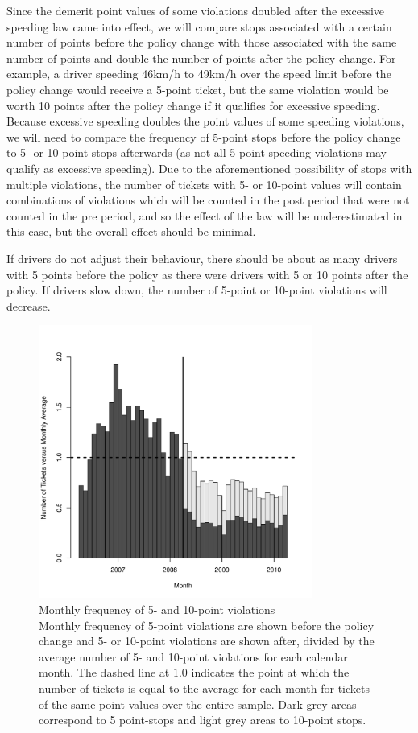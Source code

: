 Since the demerit point values of some violations doubled 
after the excessive speeding law came into effect, 
% 
we will compare stops associated with a certain number of points 
before the policy change with those associated with the 
same number of points and double the number of points after the policy change. 
For example, a driver speeding 46km/h to 49km/h over the speed limit 
before the policy change would receive a 5-point ticket, 
but the same violation would be worth 10 points after the policy change 
if it qualifies for excessive speeding. 
Because excessive speeding doubles the point values of some speeding violations, 
we will need to compare the frequency of 5-point stops before the policy change 
to 5- or 10-point stops afterwards 
(as not all 5-point speeding violations may qualify as excessive speeding). 
Due to the aforementioned possibility of stops with multiple violations, 
the number of tickets with 5- or 10-point values will contain 
combinations of violations which will be counted in the post period 
that were not counted in the pre period, and so the effect of the law 
will be underestimated in this case, but the overall effect should be minimal.

If drivers do not adjust their behaviour, 
there should be about as many drivers with 5 points before the policy 
as there were drivers with 5 or 10 points after the policy. 
If drivers slow down, the number of 5-point or 10-point violations will decrease. 


\begin{figure}
\centering
\includegraphics[width=0.8\textwidth]{Figures/num_pts_5_10_all}
\caption{Monthly frequency of 5- and 10-point violations \\
Monthly frequency of 5-point violations are shown before the policy change 
and 5- or 10-point violations are shown after, 
divided by the average number of 5- and 10-point violations
for each calendar month. 
% 
The dashed line at $1.0$ indicates the point at which 
the number of tickets is equal to the average for each month 
for tickets of the same point values over the entire sample.
% 
Dark grey areas correspond to 5 point-stops and light grey areas to 10-point stops.
}\label{fig:num_pts_5_10_all}
\end{figure}


